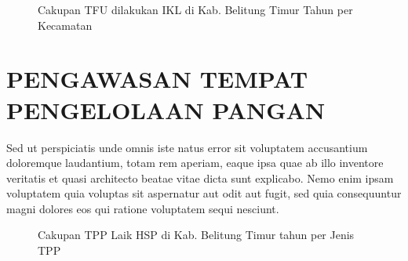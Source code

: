 \begin{figure}[H]
	\centering
	\caption{Cakupan TFU dilakukan IKL di Kab. Belitung Timur Tahun \tP per Kecamatan}
	\label{fig:Cakupan-TFU-IKL}
\end{figure}

\section{PENGAWASAN TEMPAT PENGELOLAAN PANGAN}
Sed ut perspiciatis unde omnis iste natus error sit voluptatem accusantium doloremque laudantium, totam rem aperiam, eaque ipsa quae ab illo inventore veritatis et quasi architecto beatae vitae dicta sunt explicabo. Nemo enim ipsam voluptatem quia voluptas sit aspernatur aut odit aut fugit, sed quia consequuntur magni dolores eos qui ratione voluptatem sequi nesciunt.

\begin{figure}[H]
	\centering
	\caption{Cakupan TPP Laik HSP di Kab. Belitung Timur tahun \tP per Jenis TPP}
	\label{fig:Cakupan-TPP-HSP}
\end{figure}
